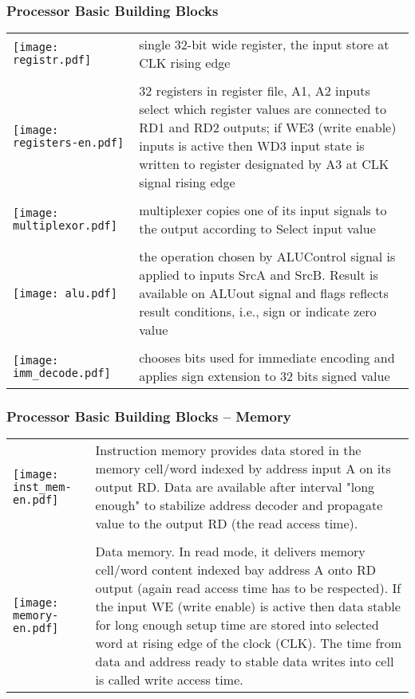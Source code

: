 \documentclass{beamer}
\begin{document}
\begin{frame}
\frametitle{Processor Basic Building Blocks}

\begin{table}
\footnotesize
\begin{tabular}{m{1.6cm} m{9.5cm}}
\hfill \texttt{[image: registr.pdf]} & single 32-bit wide register, the input store at CLK rising edge \\
\phantom{X} & \phantom{X} \\
\hfill \texttt{[image: registers-en.pdf]} & 32 registers in register file, A1, A2 inputs select which register values are connected to RD1 and RD2 outputs; if WE3 (write enable) inputs is active then WD3 input state is written to register designated by A3 at CLK signal rising edge \\
\phantom{X} & \phantom{X} \\
\hfill \texttt{[image: multiplexor.pdf]} & multiplexer copies one of its input signals to the output according to Select input value \\
\phantom{X} & \phantom{X} \\
\hfill \texttt{[image: alu.pdf]} & the operation chosen by ALUControl signal is applied to inputs SrcA and SrcB. Result is available on ALUout signal and flags reflects result conditions, i.e., sign or indicate zero value\\
\phantom{X} & \phantom{X} \\
\hfill \texttt{[image: imm\_decode.pdf]} & chooses bits used for immediate encoding and applies sign extension to 32 bits signed value \\
\end{tabular}
\end{table}

\end{frame}


\begin{frame}
\frametitle{Processor Basic Building Blocks -- Memory}

\begin{table}
\footnotesize
\begin{tabular}{m{2.2cm} m{9.0cm}}
\hfill \texttt{[image: inst\_mem-en.pdf]} & Instruction memory provides data stored in the memory cell/word indexed by address input A on its output RD. Data are available after interval "long enough" to stabilize address decoder and propagate value to the output RD (the read access time).\\
\phantom{X} & \phantom{X} \\
\hfill \texttt{[image: memory-en.pdf]} & Data memory. In read mode, it delivers memory cell/word content indexed bay address A onto RD output (again read access time has to be respected). If the input WE (write enable) is active then data stable for long enough setup time are stored into selected word at rising edge of the clock (CLK). The time from data and address ready to stable data writes into cell is called write access time.\\
\end{tabular}
\end{table}

\end{frame}
\end{document}
